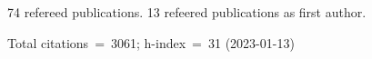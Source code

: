 74 refereed publications. 13 refeered publications as first author.

Total citations~=~3061; h-index~=~31 (2023-01-13)